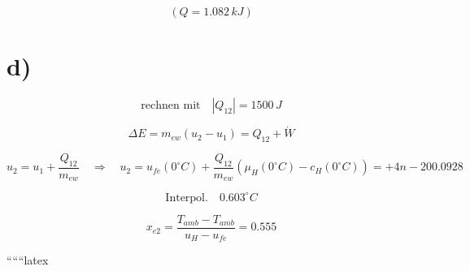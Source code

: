 \[
(Q = 1.082 \, kJ)
\]

\section*{d)}

\[
\text{rechnen mit} \quad |Q_{12}| = 1500 \, J
\]

\[
\Delta E = m_{ew} (u_2 - u_1) = Q_{12} + \dot{W}
\]

\[
u_2 = u_1 + \frac{Q_{12}}{m_{ew}} \quad \Rightarrow \quad u_2 = u_{fe}(0^\circ C) + \frac{Q_{12}}{m_{ew}} \left( \mu_{H}(0^\circ C) - c_{H}(0^\circ C) \right) = + 4n - 200.0928
\]

\[
\text{Interpol.} \quad 0.603^\circ C
\]

\[
x_{e2} = \frac{T_{amb} - T_{amb}}{u_{H} - u_{fe}} = 0.555
\]

``````latex


